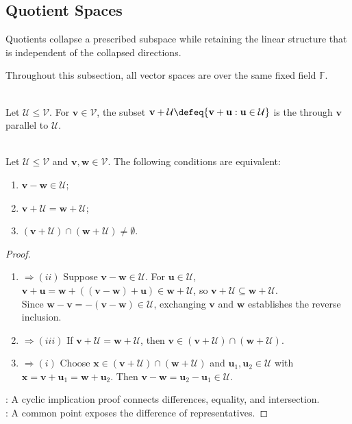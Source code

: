 \subsection{Quotient Spaces}
Quotients collapse a prescribed subspace while retaining the linear structure that is independent of the collapsed directions.

Throughout this subsection, all vector spaces are over the same fixed field $\mathbb{F}$.

\begin{definition} \label{def:affine-subset-parallel-subspace} \\
Let $\mathcal{U}\leq\mathcal{V}$. For $\mathbf{v}\in\mathcal{V}$, the subset $\mathbf{v}+\mathcal{U}\defeq\{\mathbf{v}+\mathbf{u}:\mathbf{u}\in\mathcal{U}\}$ is the  through $\mathbf{v}$ parallel to $\mathcal{U}$.
\end{definition}

\begin{proposition} \label{prop:parallel-affine-subsets-equal-or-disjoint} \\
Let $\mathcal{U}\leq\mathcal{V}$ and $\mathbf{v},\mathbf{w}\in\mathcal{V}$. The following conditions are equivalent:
\begin{enumerate}[label=(\roman*)]
\setlength{\itemsep}{0pt}
\item $\mathbf{v}-\mathbf{w}\in\mathcal{U}$;
\item $\mathbf{v}+\mathcal{U}=\mathbf{w}+\mathcal{U}$;
\item $(\mathbf{v}+\mathcal{U})\cap(\mathbf{w}+\mathcal{U})\neq\emptyset$.
\end{enumerate}
\begin{proof}
\begin{enumerate}[label=(\roman*)]
\setlength{\itemsep}{0pt}
\item[$(i)$] $\Rightarrow (ii)$ Suppose $\mathbf{v}-\mathbf{w}\in\mathcal{U}$. For $\mathbf{u}\in\mathcal{U}$, $\mathbf{v}+\mathbf{u}=\mathbf{w}+((\mathbf{v}-\mathbf{w})+\mathbf{u})\in\mathbf{w}+\mathcal{U}$, so $\mathbf{v}+\mathcal{U}\subseteq\mathbf{w}+\mathcal{U}$.\\
Since $\mathbf{w}-\mathbf{v}=-(\mathbf{v}-\mathbf{w})\in\mathcal{U}$, exchanging $\mathbf{v}$ and $\mathbf{w}$ establishes the reverse inclusion.
\item[$(ii)$] $\Rightarrow (iii)$ If $\mathbf{v}+\mathcal{U}=\mathbf{w}+\mathcal{U}$, then $\mathbf{v}\in(\mathbf{v}+\mathcal{U})\cap(\mathbf{w}+\mathcal{U})$.
\item[$(iii)$] $\Rightarrow (i)$ Choose $\mathbf{x}\in(\mathbf{v}+\mathcal{U})\cap(\mathbf{w}+\mathcal{U})$ and $\mathbf{u}_1,\mathbf{u}_2\in\mathcal{U}$ with $\mathbf{x}=\mathbf{v}+\mathbf{u}_1=\mathbf{w}+\mathbf{u}_2$. Then $\mathbf{v}-\mathbf{w}=\mathbf{u}_2-\mathbf{u}_1\in\mathcal{U}$.
\end{enumerate}
: A cyclic implication proof connects differences, equality, and intersection.\\
: A common point exposes the difference of representatives.
\end{proof}
\end{proposition}

